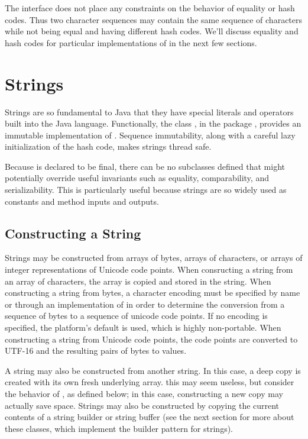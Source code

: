 The  interface does not place any constraints on
the behavior of equality or hash codes.  Thus two character sequences
may contain the same sequence of characters while not being equal
and having different hash codes.  We'll discuss equality and hash
codes for particular implementations of  in the
next few sections.


\section{Strings}

Strings are so fundamental to Java that they have special literals and
operators built into the Java language.  Functionally, the class
, in the package , provides an immutable
implementation of .  Sequence immutability, along
with a careful lazy initialization of the hash code, makes strings
thread safe.

Because  is declared to be final, there can be no
subclasses defined that might potentially override useful invariants
such as equality, comparability, and serializability.  This is
particularly useful because strings are so widely used as constants
and method inputs and outputs.

\subsection{Constructing a String}

Strings may be constructed from arrays of bytes, arrays of characters,
or arrays of integer representations of Unicode code points.  When
consructing a string from an array of characters, the array is copied
and stored in the string.  When constructing a string from bytes, a
character encoding must be specified by name or through an
implementation of  in order to determine the
conversion from a sequence of bytes to a sequence of unicode code
points.  If no encoding is specified, the platform's default is used,
which is highly non-portable.  When constructing a string from Unicode
code points, the code points are converted to UTF-16 and the resulting
pairs of bytes to  values.  

A string may also be constructed from another string.  In this case, a
deep copy is created with its own fresh underlying array.  this may
seem useless, but consider the behavior of , as
defined below; in this case, constructing a new copy may actually save
space.  Strings may also be constructed by copying the current
contents of a string builder or string buffer (see the next section
for more about these classes, which implement the builder pattern for
strings).

